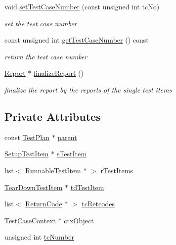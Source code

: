 \begin{DoxyCompactItemize}
void \hyperlink{classit_1_1testbench_1_1data_1_1TestCase_ad38999e7794d219847327d01689a08ee}{set\-Test\-Case\-Number} (const unsigned int tc\-No)
\begin{DoxyCompactList}\small\item\em set the test case number \end{DoxyCompactList}\item 
const unsigned int \hyperlink{classit_1_1testbench_1_1data_1_1TestCase_a679bc6cdfe23716461009c61191dbd22}{get\-Test\-Case\-Number} () const 
\begin{DoxyCompactList}\small\item\em return the test case number \end{DoxyCompactList}\item 
\hyperlink{classit_1_1testbench_1_1data_1_1Report}{Report} $\ast$ \hyperlink{classit_1_1testbench_1_1data_1_1TestCase_a04f88bf593d93a1514b886a1e3967ff7}{finalize\-Report} ()
\begin{DoxyCompactList}\small\item\em finalize the report by the reports of the single test items \end{DoxyCompactList}\end{DoxyCompactItemize}
\subsection*{Private Attributes}
\begin{DoxyCompactItemize}
\item 
const \hyperlink{classit_1_1testbench_1_1data_1_1TestPlan}{Test\-Plan} $\ast$ \hyperlink{classit_1_1testbench_1_1data_1_1TestCase_a80afa358e2299772f9fbe5e788789280}{parent}
\item 
\hyperlink{classit_1_1testbench_1_1data_1_1SetupTestItem}{Setup\-Test\-Item} $\ast$ \hyperlink{classit_1_1testbench_1_1data_1_1TestCase_ae1f04f1177b5a11841cedf052c270631}{s\-Test\-Item}
\item 
list$<$ \hyperlink{classit_1_1testbench_1_1data_1_1RunnableTestItem}{Runnable\-Test\-Item} $\ast$ $>$ \hyperlink{classit_1_1testbench_1_1data_1_1TestCase_a4d596b1e388e3955dc6007e64391e214}{r\-Test\-Items}
\item 
\hyperlink{classit_1_1testbench_1_1data_1_1TearDownTestItem}{Tear\-Down\-Test\-Item} $\ast$ \hyperlink{classit_1_1testbench_1_1data_1_1TestCase_a58c8c8823ed6c7521d1c47d621ba01d8}{td\-Test\-Item}
\item 
list$<$ \hyperlink{structit_1_1testbench_1_1data_1_1ReturnCode}{Return\-Code} $\ast$ $>$ \hyperlink{classit_1_1testbench_1_1data_1_1TestCase_a4754cbcd70fd4d23a745a80af3caf28c}{tc\-Retcodes}
\item 
\hyperlink{classit_1_1testbench_1_1data_1_1TestCaseContext}{Test\-Case\-Context} $\ast$ \hyperlink{classit_1_1testbench_1_1data_1_1TestCase_af03e52147e65966b332f3374f8df9f0c}{ctx\-Object}
\item 
unsigned int \hyperlink{classit_1_1testbench_1_1data_1_1TestCase_ab59292afb38506aa15b5b83c758805b5}{tc\-Number}
\end{DoxyCompactItemize}


